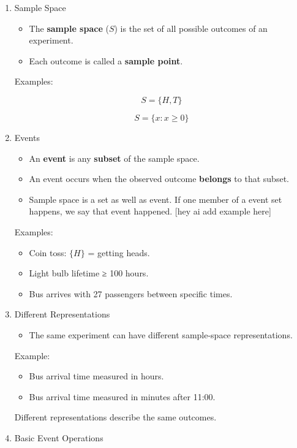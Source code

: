 \documentclass[11pt]{article}
\begin{document}
\begin{enumerate}
\item Sample Space
\label{sec:orgbebddbd}

\begin{itemize}
\item The \textbf{sample space} (\(S\)) is the set of all possible outcomes of an experiment.
\item Each outcome is called a \textbf{sample point}.
\end{itemize}

Examples:

\[
S=\{H,T\}
\]

\[
S=\{x:x\ge0\}
\]
\item Events
\label{sec:orgf98d4dd}

\begin{itemize}
\item An \textbf{event} is any \textbf{subset} of the sample space.
\item An event occurs when the observed outcome \textbf{belongs} to that subset.
\item Sample space is a set as well as event. If one member of a event set happens, we say that event happened. [hey ai add example here]
\end{itemize}

Examples:

\begin{itemize}
\item Coin toss: \(\{H\}\) = getting heads.
\item Light bulb lifetime ≥ 100 hours.
\item Bus arrives with 27 passengers between specific times.
\end{itemize}
\item Different Representations
\label{sec:org7aab8ae}

\begin{itemize}
\item The same experiment can have different sample-space representations.
\end{itemize}

Example:

\begin{itemize}
\item Bus arrival time measured in hours.
\item Bus arrival time measured in minutes after 11:00.
\end{itemize}

Different representations describe the same outcomes.
\item Basic Event Operations
\label{sec:org3c2b94e}


\end{enumerate}
\end{document}

